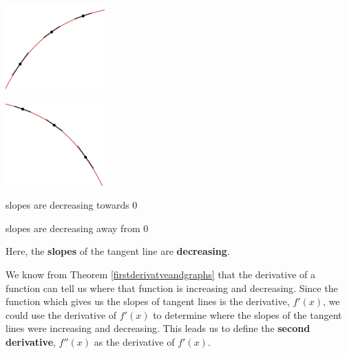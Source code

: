 \begin{center}

\begin{multicols}{2}

\includegraphics[width=1.5in]{./AppDerivativesGraphics/IncCD.png} 

\includegraphics[width=1.5in]{./AppDerivativesGraphics/DecCD.png} 

\end{multicols}

\end{center}

\begin{center}

\begin{multicols}{2}

slopes are decreasing towards $0$

slopes are decreasing away from $0$

\end{multicols}

\end{center}

Here, the \textbf{slopes} of the tangent line are \textbf{decreasing}.  

\medskip

We know from Theorem \ref{firstderivatveandgraphs} that the derivative of a function can tell us where that function is increasing and decreasing.  Since the function which gives us the slopes of tangent lines is the derivative, $f'(x)$, we could use the derivative of $f'(x)$ to determine where the slopes of the tangent lines were increasing and decreasing.  This leads us to define the \textbf{second derivative}, $f''(x)$  as the derivative of $f'(x)$.

\medskip

